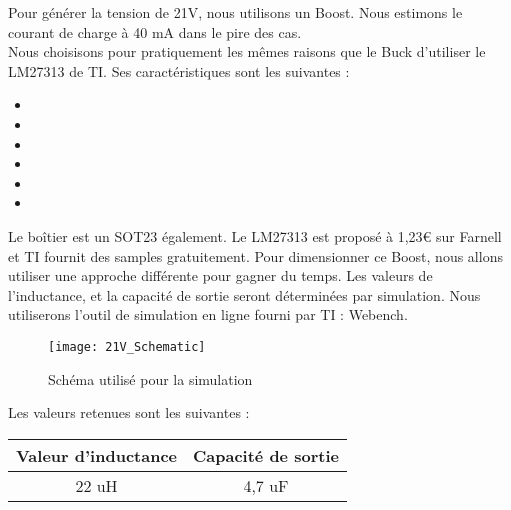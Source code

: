 \begin{itemize}
	      Pour générer la tension de 21V, nous utilisons un Boost.
	      Nous estimons le courant de charge à 40 mA dans le pire des cas. \\
	      Nous choisisons pour pratiquement les mêmes raisons que le Buck d'utiliser le LM27313 de TI. Ses caractéristiques sont les suivantes : 
	      \begin{itemize}
	      	\item {}
	      	\item {}
	      	\item {}
	      	\item {}
	      	\item {}
	      	\item {}
	      \end{itemize}
	      	              
	      Le boîtier est un SOT23 également. Le LM27313 est proposé à 1,23€ sur Farnell et TI fournit des samples gratuitement.
	      Pour dimensionner ce Boost, nous allons utiliser une approche différente pour gagner du temps. 
	      Les valeurs de l'inductance, et la capacité de sortie seront déterminées par simulation.
	      Nous utiliserons l'outil de simulation en ligne fourni par TI : Webench.
	      	                  
	      \begin{figure}[H]
	      	\begin{center}
	      		\texttt{[image: 21V\_Schematic]}
	      	\end{center}
	      	\caption{Schéma utilisé pour la simulation}
	      \end{figure}
	      	                  
	      Les valeurs retenues sont les suivantes :
	      	                  
	      \begin{center}
	      	\begin{tabular}{|c|c|}
	      		\hline
	      		Valeur d'inductance & Capacité de sortie \\
	      		\hline
	      		22 uH               & 4,7 uF              \\
	      		\hline
	      	\end{tabular}
	      \end{center}
	      	                  

\end{itemize}
